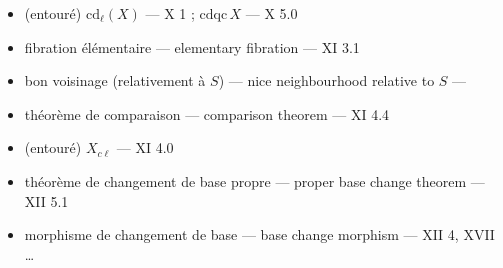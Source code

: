 \documentclass[11pt,a4paper]{article}
\begin{document}
\begin{itemize}
{crayon, un « $\ell$ » en regard de cette ligne et de la suivante, pour le signe
de la machine}
\item (entouré) $\mathrm{cd}_{\ell}(X)$ --- X 1 ; $\mathrm{cdqc}\,X$ --- X 5.0
\item fibration élémentaire --- elementary fibration --- XI 3.1
\item bon voisinage (relativement à $S$) --- nice neighbourhood relative to $S$
--- 
\item théorème de comparaison --- comparison theorem --- XI 4.4
\item (entouré) $X_{c\ell}$ --- XI 4.0
\end{itemize}


\begin{itemize}
\item théorème de changement de base propre --- proper base change theorem ---
XII 5.1
\item morphisme de changement de base --- base change morphism --- XII 4, XVII
\ldots
\end{itemize}

\end{document}
